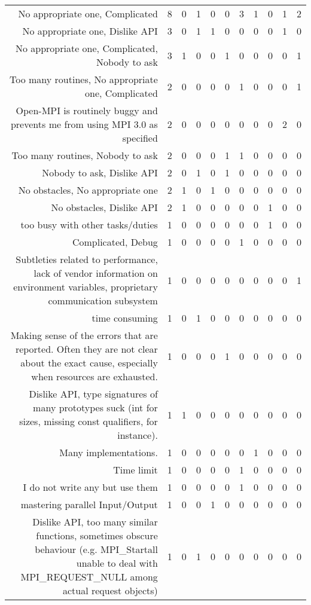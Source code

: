 {\begin{landscape}
\begin{longtable}[htb]{r|c|c|c|c|c|c|c|c|c|c}
{No appropriate one, Complicated} & 8 & 0 & 1 & 0 & 0 & 3 & 1 & 0 & 1 & 2 \\%
{No appropriate one, Dislike API} & 3 & 0 & 1 & 1 & 0 & 0 & 0 & 0 & 1 & 0 \\%
{No appropriate one, Complicated, Nobody to ask} & 3 & 1 & 0 & 0 & 1 & 0 & 0 & 0 & 0 & 1 \\%
{Too many routines, No appropriate one, Complicated} & 2 & 0 & 0 & 0 & 0 & 1 & 0 & 0 & 0 & 1 \\%
{Open-MPI is routinely buggy and prevents me from using MPI 3.0 as specified} & 2 & 0 & 0 & 0 & 0 & 0 & 0 & 0 & 2 & 0 \\%
{Too many routines, Nobody to ask} & 2 & 0 & 0 & 0 & 1 & 1 & 0 & 0 & 0 & 0 \\%
{Nobody to ask, Dislike API} & 2 & 0 & 1 & 0 & 1 & 0 & 0 & 0 & 0 & 0 \\%
{No obstacles, No appropriate one} & 2 & 1 & 0 & 1 & 0 & 0 & 0 & 0 & 0 & 0 \\%
{No obstacles, Dislike API} & 2 & 1 & 0 & 0 & 0 & 0 & 0 & 1 & 0 & 0 \\%
{too busy with other tasks/duties} & 1 & 0 & 0 & 0 & 0 & 0 & 0 & 1 & 0 & 0 \\%
{Complicated, Debug} & 1 & 0 & 0 & 0 & 0 & 1 & 0 & 0 & 0 & 0 \\%
{Subtleties related to performance, lack of vendor information on environment variables, proprietary communication subsystem} & 1 & 0 & 0 & 0 & 0 & 0 & 0 & 0 & 0 & 1 \\%
{time consuming} & 1 & 0 & 1 & 0 & 0 & 0 & 0 & 0 & 0 & 0 \\%
{Making sense of the errors that are reported. Often they are not clear about the exact cause, especially when resources are exhausted.} & 1 & 0 & 0 & 0 & 1 & 0 & 0 & 0 & 0 & 0 \\%
{Dislike API, type signatures of many prototypes suck (int for sizes, missing const qualifiers, for instance).} & 1 & 1 & 0 & 0 & 0 & 0 & 0 & 0 & 0 & 0 \\%
{Many implementations.} & 1 & 0 & 0 & 0 & 0 & 0 & 1 & 0 & 0 & 0 \\%
{Time limit} & 1 & 0 & 0 & 0 & 0 & 1 & 0 & 0 & 0 & 0 \\%
{I do not write any but use them} & 1 & 0 & 0 & 0 & 0 & 1 & 0 & 0 & 0 & 0 \\%
{mastering parallel Input/Output} & 1 & 0 & 0 & 1 & 0 & 0 & 0 & 0 & 0 & 0 \\%
{Dislike API, too many similar functions, sometimes obscure behaviour (e.g. MPI\_Startall unable to deal with MPI\_REQUEST\_NULL among actual request objects)} & 1 & 0 & 1 & 0 & 0 & 0 & 0 & 0 & 0 & 0 \\%

\end{longtable}
\end{landscape}}
